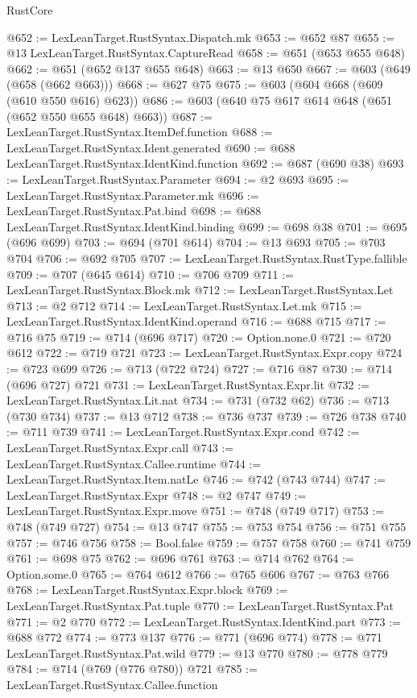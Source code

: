 \begin{lexlean}{RustCore}
\begin{coremodule}
@652 := LexLeanTarget.RustSyntax.Dispatch.mk
@653 := @652 @87
@655 := @13 LexLeanTarget.RustSyntax.CaptureRead
@658 := @651 (@653 @655 @648)
@662 := @651 (@652 @137 @655 @648)
@663 := @13 @650
@667 := @603 (@649 (@658 (@662 @663)))
@668 := @627 @75
@675 := @603 (@604 @668 (@609 (@610 @550 @616) @623))
@686 := @603 (@640 @75 @617 @614 @648 (@651 (@652 @550 @655 @648) @663))
@687 := LexLeanTarget.RustSyntax.ItemDef.function
@688 := LexLeanTarget.RustSyntax.Ident.generated
@690 := @688 LexLeanTarget.RustSyntax.IdentKind.function
@692 := @687 (@690 @38)
@693 := LexLeanTarget.RustSyntax.Parameter
@694 := @2 @693
@695 := LexLeanTarget.RustSyntax.Parameter.mk
@696 := LexLeanTarget.RustSyntax.Pat.bind
@698 := @688 LexLeanTarget.RustSyntax.IdentKind.binding
@699 := @698 @38
@701 := @695 (@696 @699)
@703 := @694 (@701 @614)
@704 := @13 @693
@705 := @703 @704
@706 := @692 @705
@707 := LexLeanTarget.RustSyntax.RustType.fallible
@709 := @707 (@645 @614)
@710 := @706 @709
@711 := LexLeanTarget.RustSyntax.Block.mk
@712 := LexLeanTarget.RustSyntax.Let
@713 := @2 @712
@714 := LexLeanTarget.RustSyntax.Let.mk
@715 := LexLeanTarget.RustSyntax.IdentKind.operand
@716 := @688 @715
@717 := @716 @75
@719 := @714 (@696 @717)
@720 := Option.none.{0}
@721 := @720 @612
@722 := @719 @721
@723 := LexLeanTarget.RustSyntax.Expr.copy
@724 := @723 @699
@726 := @713 (@722 @724)
@727 := @716 @87
@730 := @714 (@696 @727) @721
@731 := LexLeanTarget.RustSyntax.Expr.lit
@732 := LexLeanTarget.RustSyntax.Lit.nat
@734 := @731 (@732 @62)
@736 := @713 (@730 @734)
@737 := @13 @712
@738 := @736 @737
@739 := @726 @738
@740 := @711 @739
@741 := LexLeanTarget.RustSyntax.Expr.cond
@742 := LexLeanTarget.RustSyntax.Expr.call
@743 := LexLeanTarget.RustSyntax.Callee.runtime
@744 := LexLeanTarget.RustSyntax.Item.natLe
@746 := @742 (@743 @744)
@747 := LexLeanTarget.RustSyntax.Expr
@748 := @2 @747
@749 := LexLeanTarget.RustSyntax.Expr.move
@751 := @748 (@749 @717)
@753 := @748 (@749 @727)
@754 := @13 @747
@755 := @753 @754
@756 := @751 @755
@757 := @746 @756
@758 := Bool.false
@759 := @757 @758
@760 := @741 @759
@761 := @698 @75
@762 := @696 @761
@763 := @714 @762
@764 := Option.some.{0}
@765 := @764 @612
@766 := @765 @606
@767 := @763 @766
@768 := LexLeanTarget.RustSyntax.Expr.block
@769 := LexLeanTarget.RustSyntax.Pat.tuple
@770 := LexLeanTarget.RustSyntax.Pat
@771 := @2 @770
@772 := LexLeanTarget.RustSyntax.IdentKind.part
@773 := @688 @772
@774 := @773 @137
@776 := @771 (@696 @774)
@778 := @771 LexLeanTarget.RustSyntax.Pat.wild
@779 := @13 @770
@780 := @778 @779
@784 := @714 (@769 (@776 @780)) @721
@785 := LexLeanTarget.RustSyntax.Callee.function

\end{coremodule}
\end{lexlean}
